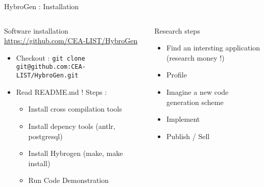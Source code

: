 \begin{Frame}{HybroGen : Installation}

 \begin{columns}[t]
  \begin{column}{\BW}
    \begin{block}{Software installation}
      \url{https://github.com/CEA-LIST/HybroGen}
      \begin{itemize}
      \item Checkout : \texttt{git clone git@github.com:CEA-LIST/HybroGen.git}
      \item Read README.md ! Steps :
        \begin{itemize}
        \item Install cross compilation tools 
        \item Install depency tools (antlr, postgresql)
        \item Install Hybrogen (make, make install)
        \item Run Code Demonstration
        \end{itemize}
      \end{itemize}
    \end{block}
  \end{column}
  \begin{column}{\BW}
    \begin{block}{Research steps}
      \begin{itemize}
      \item Find an intersting application (research money !)
      \item Profile
      \item Imagine a new code generation scheme
      \item Implement
      \item Publish / Sell
      \end{itemize}
    \end{block}
  \end{column}

 \end{columns}
\end{Frame}
